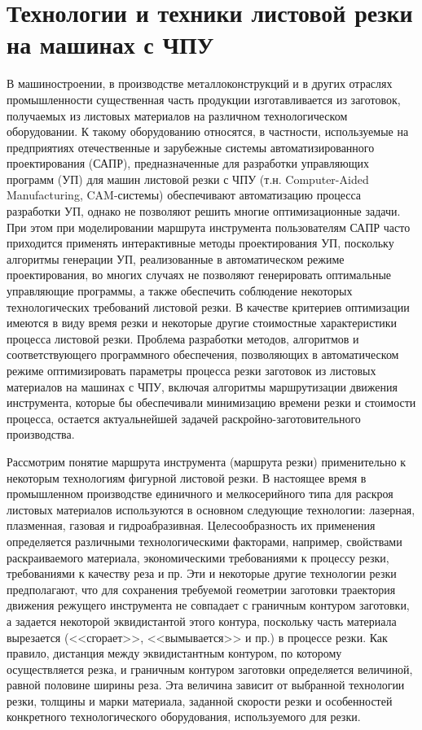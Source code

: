 \documentclass[11pt,twoside]{report}
\begin{document}
\section{Технологии и техники листовой резки на машинах с ЧПУ}

В машиностроении, в производстве металлоконструкций
и в других отраслях промышленности существенная часть продукции
изготавливается из заготовок,
получаемых из листовых материалов на различном технологическом оборудовании.
К такому оборудованию относятся, в частности,
используемые на предприятиях отечественные и зарубежные
системы автоматизированного проектирования (САПР),
предназначенные для разработки управляющих программ (УП)
для машин листовой резки с ЧПУ
(т.н. Computer-Aided Manufacturing, CAM-системы)
обеспечивают автоматизацию процесса разработки УП,
однако не позволяют решить многие оптимизационные задачи.
При этом при моделировании маршрута инструмента пользователям
САПР часто приходится применять интерактивные методы проектирования УП,
поскольку алгоритмы генерации УП,
реализованные в автоматическом режиме проектирования,
во многих случаях не позволяют генерировать оптимальные управляющие программы,
а также обеспечить соблюдение некоторых технологических требований листовой резки.
В качестве критериев оптимизации имеются в виду время резки и
некоторые другие стоимостные характеристики процесса листовой резки.
Проблема разработки методов, алгоритмов и соответствующего программного обеспечения,
позволяющих в автоматическом режиме оптимизировать параметры
процесса резки заготовок из листовых материалов на машинах с ЧПУ,
включая алгоритмы маршрутизации движения инструмента,
которые бы обеспечивали минимизацию времени резки и стоимости процесса,
остается актуальнейшей задачей раскройно-заготовительного производства.

Рассмотрим понятие маршрута инструмента (маршрута резки)
применительно к некоторым технологиям фигурной листовой резки.
В настоящее время в промышленном производстве
единичного и мелкосерийного типа для раскроя листовых материалов
используются в основном следующие технологии:
лазерная, плазменная, газовая и гидроабразивная.
Целесообразность их применения определяется различными технологическими факторами,
например, свойствами раскраиваемого материала,
экономическими требованиями к процессу резки,
требованиями к качеству реза и пр.
Эти и некоторые другие технологии резки предполагают,
что для сохранения требуемой геометрии заготовки
траектория движения режущего инструмента не совпадает
с граничным контуром заготовки,
а задается некоторой эквидистантой этого контура,
поскольку часть материала вырезается (<<сгорает>>, <<вымывается>> и пр.)
в процессе резки.
Как правило, дистанция между эквидистантным контуром,
по которому осуществляется резка, и граничным контуром заготовки определяется величиной,
равной половине ширины реза.
Эта величина зависит от выбранной технологии резки,
толщины и марки материала, заданной скорости резки
и особенностей конкретного технологического оборудования,
используемого для резки.
\end{document}
